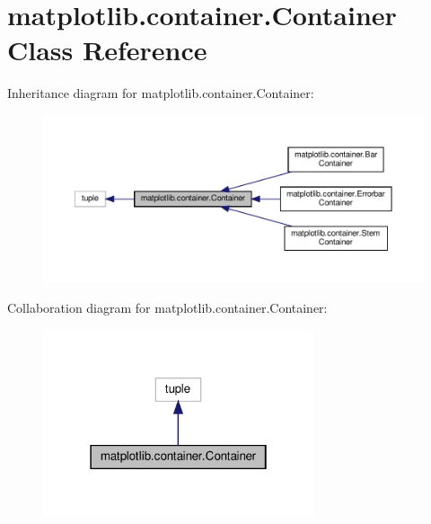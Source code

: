 \hypertarget{classmatplotlib_1_1container_1_1Container}{}\section{matplotlib.\+container.\+Container Class Reference}
\label{classmatplotlib_1_1container_1_1Container}


Inheritance diagram for matplotlib.\+container.\+Container\+:
\nopagebreak
\begin{figure}[H]
\begin{center}
\leavevmode
\includegraphics[width=350pt]{classmatplotlib_1_1container_1_1Container__inherit__graph}
\end{center}
\end{figure}


Collaboration diagram for matplotlib.\+container.\+Container\+:
\nopagebreak
\begin{figure}[H]
\begin{center}
\leavevmode
\includegraphics[width=226pt]{classmatplotlib_1_1container_1_1Container__coll__graph}
\end{center}
\end{figure}
